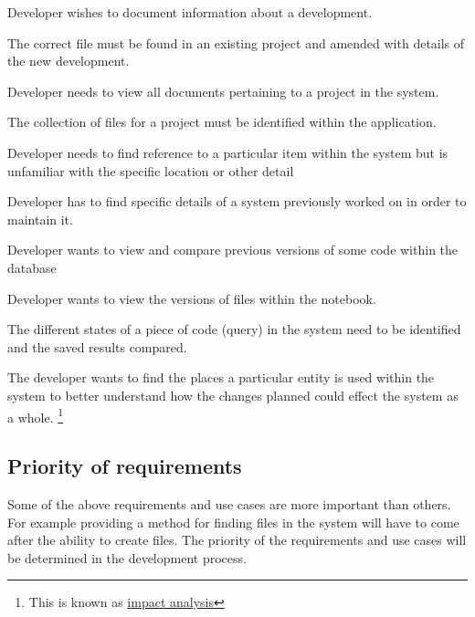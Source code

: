 \begin{usecase}
Developer wishes to document information about a development.

The correct file must be found in an existing project and amended with details
of the new development.
\end{usecase}
\begin{usecase}
Developer needs to view all documents pertaining to a project in the
system.

The collection of files for a project must be identified within the
application.
\end{usecase}
\begin{usecase}
Developer needs to find reference to a particular item within the system
but is unfamiliar with the specific location or other detail

\end{usecase}
\begin{usecase}
Developer has to find specific details of a system previously worked on
in order to maintain it.

\end{usecase}
\begin{usecase}
Developer wants to view and compare previous versions of some code
within the database

\end{usecase}
\begin{usecase}
Developer wants to view the versions of files within the notebook.

The different states of a piece of code (query) in the system need to be identified and the saved results compared.

\end{usecase}
\begin{usecase}
The developer wants to find the places a particular entity is used
within the system to better understand how the changes planned could
effect the system as a whole. \footnote{%
  This is known as %
  \href{https://en.wikipedia.org/wiki/Change\_impact\_analysis}{impact
analysis}%
}

\end{usecase}

\subsection{Priority of requirements}

Some of the above requirements and use cases are more important than others. For example providing a method for finding files in the system will have to come after the ability to create files.
The priority of the requirements and use cases will be determined in the development process.

